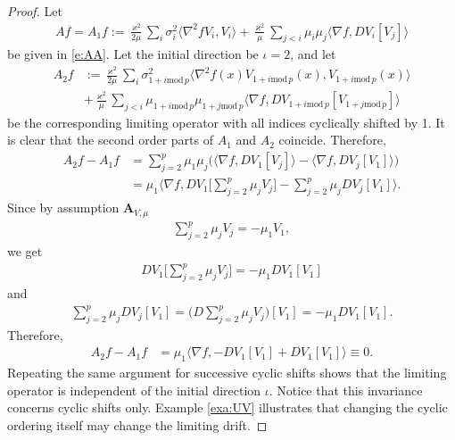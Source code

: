 \documentclass[10pt,a4paper]{amsart}
\newcommand{\ba}{\begin{equation}\begin{aligned}}
\newcommand{\ea}{\end{aligned}\end{equation}}
\begin{document}
\begin{proof}
Let
\ba
Af=A_1 f:=\frac{\varkappa^2}{2\mu} \sum_i  \sigma_{i}^2
\langle \nabla^2 fV_i , V_i \rangle
+\frac{\varkappa^2}{\mu} \sum_{j<i}
\mu_i\mu_j  \langle \nabla f ,  D V_i[V_j]  \rangle
\ea
be given in \eqref{e:AA}. Let the initial direction be $\iota=2$, and let
 \ba
A_2 f & :=\frac{\varkappa^2}{2\mu} \sum_i  \sigma_{1+i\mathrm{mod}\,p}^2
\langle \nabla^2 f(x)V_{1+i\mathrm{mod}\,p}(x), V_{1+i\mathrm{mod}\,p}(x)\rangle\\
&+\frac{\varkappa^2}{\mu}
\sum_{j<i} \mu_{1+i\mathrm{mod}\,p}\mu_{1+j\mathrm{mod}\,p}  \langle \nabla f,
D V_{1+i\mathrm{mod}\,p}[V_{1+j\mathrm{mod}\,p}] \rangle
\ea
be the corresponding limiting operator with all indices cyclically shifted by 1.
It is clear that the second order parts of $A_1$ and $A_2$ coincide. Therefore,
\ba
A_2f - A_1 f &=\sum_{j=2}^{p} \mu_1\mu_j \Big(\langle \nabla f,  D V_1[V_j] \rangle - \langle \nabla f,  D V_j[V_1] \rangle\Big)\\
&=\mu_1 \Big\langle\nabla f, DV_1\Big[ \sum_{j=2}^{p} \mu_jV_j   \Big]  -  \sum_{j=2}^{p} \mu_j DV_j[V_1]    \Big\rangle.
\ea
Since by assumption $\mathbf{A}_{V,\mu}$
\ba
 \sum_{j=2}^{p} \mu_j V_j=-\mu_1 V_1,
\ea
we get
\ba
  DV_1\Big[ \sum_{j=2}^{p} \mu_jV_j   \Big] =-\mu_1 DV_1[V_1]
\ea
and
\ba
\sum_{j=2}^{p} \mu_j DV_j[V_1] = \Big(D\sum_{j=2}^{p} \mu_jV_j\Big)[V_1]
=-\mu_1 DV_1[V_1].
\ea
Therefore,
\ba
A_2f - A_1f &=\mu_1 \Big\langle\nabla f, -DV_1 [ V_1 ] +   DV_1 [ V_1 ]    \Big\rangle\equiv  0.
\ea
Repeating the same argument for successive cyclic shifts shows that the limiting operator
is independent of the initial direction $\iota$. Notice that this invariance concerns cyclic shifts only.
Example \ref{exa:UV} illustrates that changing the cyclic ordering itself may change the limiting drift.
\end{proof}
\end{document}
